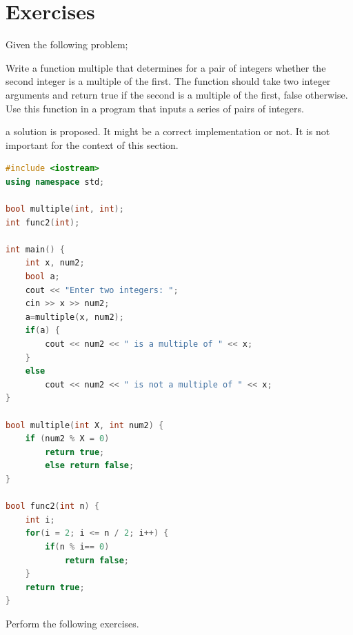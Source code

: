 \section{Exercises}
Given the following problem;
\begin{displayquote}
    Write a function multiple that determines for a pair of integers whether the second integer is a multiple of the first. The function should take two integer arguments and return true if the second is a multiple of the first, false otherwise. Use this function in a program that inputs a series of pairs of integers.
\end{displayquote}
a solution is proposed. It might be a correct implementation or not. It is not important for the context of this section.
\begin{lstlisting}[language=C++]
#include <iostream>
using namespace std;

bool multiple(int, int);
int func2(int);

int main() {
    int x, num2;
    bool a;
    cout << "Enter two integers: ";
    cin >> x >> num2;
    a=multiple(x, num2);
    if(a) {
        cout << num2 << " is a multiple of " << x;
    }
    else
        cout << num2 << " is not a multiple of " << x;
}

bool multiple(int X, int num2) {
    if (num2 % X = 0)
        return true;
        else return false;
}

bool func2(int n) {
    int i;
    for(i = 2; i <= n / 2; i++) {
        if(n % i== 0)
            return false;
    }
    return true;
}
\end{lstlisting}
Perform the following exercises.

